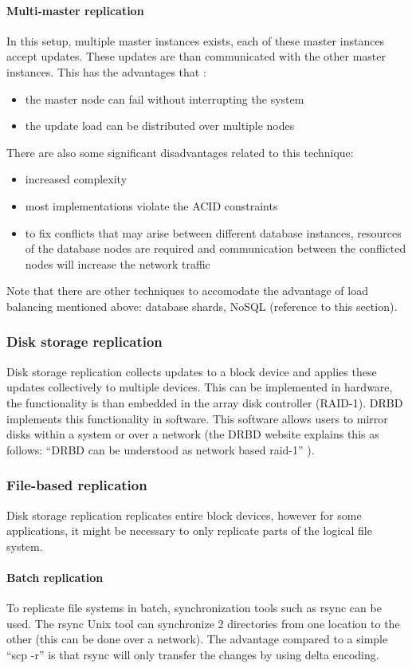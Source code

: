 \documentclass[12pt]{report}
\begin{document}
\paragraph*{Multi-master replication}
In this setup, multiple master instances exists, each of these master
instances accept updates. These updates are than communicated with the
other master instances. 
This has the advantages that :
\begin{itemize}
\item the master node can fail without interrupting the system
\item the update load can be distributed over multiple nodes
\end{itemize}
There are also some significant disadvantages related to this technique:
\begin{itemize} 
\item increased complexity
\item most implementations violate the ACID constraints
\item to fix conflicts that may arise between different database
  instances, resources of the database nodes are required and
  communication between the conflicted nodes will increase the network
  traffic
\end{itemize}
Note that there are other techniques to accomodate the advantage of
load balancing mentioned above: database shards, NoSQL (reference to
this section).

\subsubsection{Disk storage replication}
Disk storage replication collects updates to a block device and
applies these updates collectively to multiple devices.
This can be implemented in hardware, the functionality is than
embedded in the array disk controller (RAID-1).
DRBD \cite{drbd_soft:2013} implements this functionality in software.
This software allows users to mirror disks within a system or over a
network (the DRBD website explains this as follows: ``DRBD can be
understood as network based raid-1'' \cite{drbd_soft:2013}).

\subsubsection{File-based replication}
Disk storage replication replicates entire block devices, however for
some applications, it might be necessary to only replicate parts of
the logical file system.
\paragraph*{Batch replication}
To replicate file systems in batch, synchronization tools such as
rsync \cite{rsync_soft:2013} can be
used. The rsync Unix tool can synchronize 2 directories from one location to the
other (this can be done over a network). The advantage compared to a
simple ``scp -r'' is that rsync will only transfer the changes by using
delta encoding.
\end{document}
